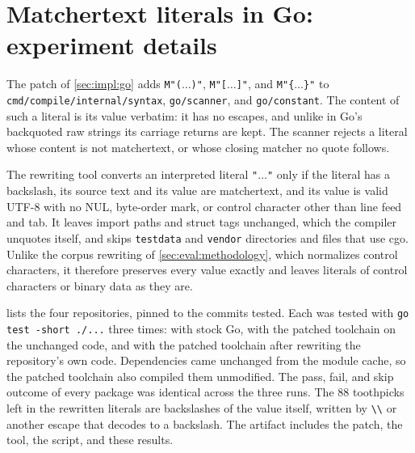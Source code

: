 \section{Matchertext literals in Go: experiment details}
\label{app:go}

The patch of \cref{sec:impl:go} adds \verb|M"(|$\dots$\verb|)"|,
\verb|M"[|$\dots$\verb|]"|, and \verb|M"{|$\dots$\verb|}"|
to \texttt{cmd/compile/internal/syntax}, \texttt{go/scanner}, and \texttt{go/constant}.
The content of such a literal is its value verbatim:
it has no escapes, and unlike in Go's backquoted raw strings
its carriage returns are kept.
The scanner rejects a literal whose content is not matchertext,
or whose closing matcher no quote follows.

The rewriting tool converts an interpreted literal \verb|"|$\dots$\verb|"|
only if the literal has a backslash,
its source text and its value are matchertext,
and its value is valid UTF-8 with no NUL, byte-order mark,
or control character other than line feed and tab.
It leaves import paths and struct tags unchanged, which the compiler unquotes itself,
and skips \texttt{testdata} and \texttt{vendor} directories
and files that use cgo.
Unlike the corpus rewriting of \cref{sec:eval:methodology},
which normalizes control characters,
it therefore preserves every value exactly
and leaves literals of control characters or binary data as they are.

 lists the four repositories,
pinned to the commits tested.
Each was tested with \verb|go test -short ./...| three times:
with stock Go, with the patched toolchain on the unchanged code,
and with the patched toolchain after rewriting the repository's own code.
Dependencies came unchanged from the module cache,
so the patched toolchain also compiled them unmodified.
The pass, fail, and skip outcome of every package
was identical across the three runs.
The 88 toothpicks left in the rewritten literals
are backslashes of the value itself, written by \verb|\\| or another escape
that decodes to a backslash.
The artifact includes the patch, the tool, the script, and these results.

